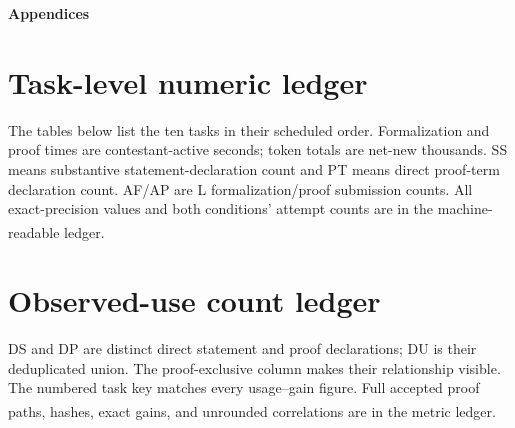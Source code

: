 \documentclass[10pt,a4paper]{article}
\newcommand{\src}[1]{\textsuperscript{\cite{#1}}}
\begin{document}
\clearpage
\appendix
\begin{center}
{\Large\bfseries Appendices}
\end{center}
\medskip
\section{Task-level numeric ledger}

The tables below list the ten tasks in their scheduled order. Formalization and proof times are contestant-active seconds; token
totals are net-new thousands. SS means substantive statement-declaration
count and PT means direct proof-term declaration count. AF/AP are L
formalization/proof submission counts. All exact-precision values and both
conditions' attempt counts are in the machine-readable ledger.
\src{taskledger,plotcode}

\begin{table}[htbp]\centering
{}
\caption{Task-level time and net-new token comparison, excluding warm-up.
\cite{taskledger,plotcode}}\label{tab:times}
\end{table}
\begin{table}[htbp]\centering
{}
\caption{Final code size, declaration reach, and L submission counts.
\cite{taskledger,declscan,plotcode}}\label{tab:code}
\end{table}

\clearpage
\section{Observed-use count ledger}

DS and DP are distinct direct statement and proof declarations; DU is their
deduplicated union. The proof-exclusive column makes their relationship
visible. The numbered task key matches every usage--gain
figure. Full accepted proof paths, hashes, exact gains, and unrounded
correlations are in the metric ledger.\src{usagepoints,metriccode}
\end{document}
